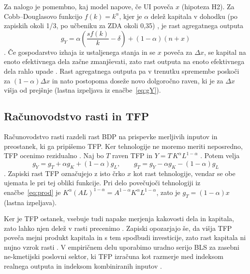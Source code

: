 \documentclass[12pt,a4paper]{article}
\begin{document}
Za nalogo je pomembno, kaj model napove, če UI poveča $x$ (hipoteza H2). Za Cobb--Douglasovo funkcijo $f(k)=k^{\alpha}$, kjer je $\alpha$ delež kapitala v dohodku (po zapiskih okoli 1/3, po učbeniku za ZDA okoli 0,35) \parencites[str.~9,~23]{polanec_rast}[str.~63]{garin2021}, je rast agregatnega outputa
\begin{equation}\label{eq:gY}
g_Y=\alpha\left(\frac{s f(k)}{k}-\delta\right)+(1-\alpha)(n+x)
\end{equation}
\parencite[str.~14]{polanec_rast}. Če gospodarstvo izhaja iz ustaljenega stanja in se $x$ poveča za $\Delta x$, se kapital na enoto efektivnega dela začne zmanjševati, zato rast outputa na enoto efektivnega dela rahlo upade \parencite[str.~14--15]{polanec_rast}. Rast agregatnega outputa pa v trenutku spremembe poskoči za $(1-\alpha)\Delta x$ in nato postopoma doseže novo dolgoročno raven, ki je za $\Delta x$ višja od prejšnje (lastna izpeljava iz enačbe~\eqref{eq:gY}).

\subsection{Računovodstvo rasti in TFP}\label{sec:racunovodstvo}
Računovodstvo rasti razdeli rast BDP na prispevke merljivih inputov in preostanek, ki ga pripišemo TFP. Ker tehnologije ne moremo meriti neposredno, TFP ocenimo rezidualno \parencite[str.~22]{polanec_rast}. Naj bo $T$ raven TFP in $Y=T\,K^{\alpha}L^{1-\alpha}$ \parencite[str.~142]{garin2021}. Potem velja
\begin{equation}\label{eq:racrasti}
g_Y=g_T+\alpha g_K+(1-\alpha)g_L,\qquad g_T=g_Y-\alpha g_K-(1-\alpha)g_L
\end{equation}
\parencite[str.~23]{polanec_rast}. Zapiski rast TFP označujejo z isto črko $x$ kot rast tehnologije, vendar se obe ujemata le pri tej obliki funkcije. Pri delo povečujoči tehnologiji iz enačbe~\eqref{eq:prod} je $K^{\alpha}(AL)^{1-\alpha}=A^{1-\alpha}K^{\alpha}L^{1-\alpha}$, zato je $g_T=(1-\alpha)x$ (lastna izpeljava).

Ker je TFP ostanek, vsebuje tudi napake merjenja kakovosti dela in kapitala, zato lahko njen delež v rasti precenimo \parencite[str.~23--24]{polanec_rast}. Zapiski opozarjajo še, da višja TFP poveča mejni produkt kapitala in s tem spodbudi investicije, zato rast kapitala ni nujno vzrok rasti \parencite[str.~24]{polanec_rast}. V empiričnem delu uporabimo uradno serijo BLS za zasebni ne-kmetijski poslovni sektor, ki TFP izračuna kot razmerje med indeksom realnega outputa in indeksom kombiniranih inputov \parencite{bls2026tfp}.
\end{document}
